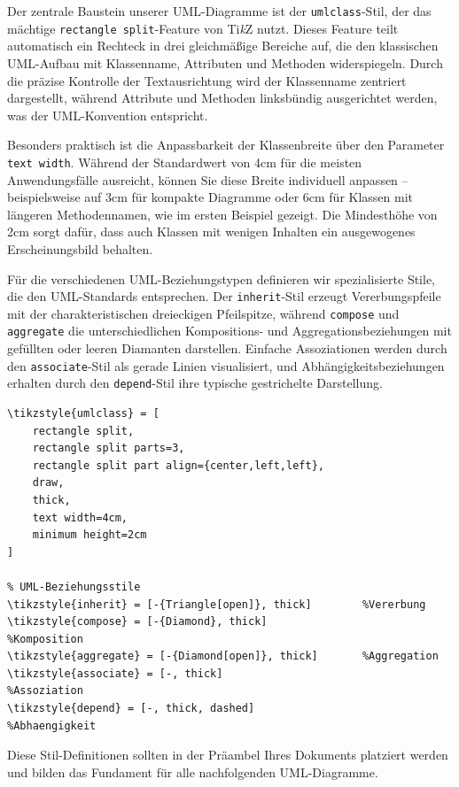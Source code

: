 Der zentrale Baustein unserer UML-Diagramme ist der \texttt{umlclass}-Stil, der das mächtige \texttt{rectangle split}-Feature von Ti\textit{k}Z nutzt. Dieses Feature teilt automatisch ein Rechteck in drei gleichmäßige Bereiche auf, die den klassischen UML-Aufbau mit Klassenname, Attributen und Methoden widerspiegeln. Durch die präzise Kontrolle der Textausrichtung wird der Klassenname zentriert dargestellt, während Attribute und Methoden linksbündig ausgerichtet werden, was der UML-Konvention entspricht.

Besonders praktisch ist die Anpassbarkeit der Klassenbreite über den Parameter \texttt{text width}. Während der Standardwert von 4cm für die meisten Anwendungsfälle ausreicht, können Sie diese Breite individuell anpassen – beispielsweise auf 3cm für kompakte Diagramme oder 6cm für Klassen mit längeren Methodennamen, wie im ersten Beispiel gezeigt. Die Mindesthöhe von 2cm sorgt dafür, dass auch Klassen mit wenigen Inhalten ein ausgewogenes Erscheinungsbild behalten.

Für die verschiedenen UML-Beziehungstypen definieren wir spezialisierte Stile, die den UML-Standards entsprechen. Der \texttt{inherit}-Stil erzeugt Vererbungspfeile mit der charakteristischen dreieckigen Pfeilspitze, während \texttt{compose} und \texttt{aggregate} die unterschiedlichen Kompositions- und Aggregationsbeziehungen mit gefüllten oder leeren Diamanten darstellen. Einfache Assoziationen werden durch den \texttt{associate}-Stil als gerade Linien visualisiert, und Abhängigkeitsbeziehungen erhalten durch den \texttt{depend}-Stil ihre typische gestrichelte Darstellung.

\begin{lstlisting}[style=latex]
% UML-Klassen-Stil
\tikzstyle{umlclass} = [
	rectangle split,
	rectangle split parts=3,
	rectangle split part align={center,left,left},
	draw,
 	thick,
	text width=4cm,
	minimum height=2cm
]

% UML-Beziehungsstile
\tikzstyle{inherit} = [-{Triangle[open]}, thick]		%Vererbung
\tikzstyle{compose} = [-{Diamond}, thick]    				%Komposition
\tikzstyle{aggregate} = [-{Diamond[open]}, thick]		%Aggregation
\tikzstyle{associate} = [-, thick]									%Assoziation
\tikzstyle{depend} = [-, thick, dashed]							%Abhaengigkeit
\end{lstlisting}

Diese Stil-Definitionen sollten in der Präambel Ihres Dokuments platziert werden und bilden das Fundament für alle nachfolgenden UML-Diagramme.



